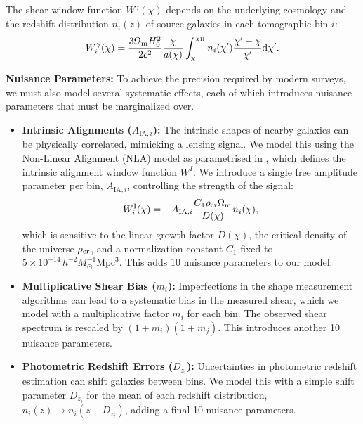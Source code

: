 \documentclass[twocolumn]{openjournal}
\begin{document}
The shear window function $W^\gamma(\chi)$ depends on the underlying cosmology and the redshift distribution $n_i(z)$ of source galaxies in each tomographic bin $i$:
\begin{equation}
	W_i^\gamma (\chi) = \frac{3 \Omega_{\rm m} H_0^2 }{2  c^2} \frac{\chi}{a(\chi)} \int_{\chi}^{\chi_{\rm H}}   n_{i}(\chi')  \frac{\chi'-\chi}{\chi'} \mathrm{d} \chi'.
\end{equation}

\textbf{Nuisance Parameters:} To achieve the precision required by modern surveys, we must also model several systematic effects, each of which introduces nuisance parameters that must be marginalized over.
\begin{itemize}
    \item \textbf{Intrinsic Alignments ($A_{\text{IA},i}$):} The intrinsic shapes of nearby galaxies can be physically correlated, mimicking a lensing signal. We model this using the Non-Linear Alignment (NLA) model \citep{hirata_04} as parametrised in \citep{Piras_2023}, which defines the intrinsic alignment window function $W^I$. We introduce a single free amplitude parameter per bin, $A_{\text{IA},i}$, controlling the strength of the signal:
    \begin{equation}
    	W_i^{\rm I}(\chi) = - A_{\mathrm{IA}, i}  \frac{C_1  \rho_{\rm cr}  \Omega_{\rm m}}{D(\chi)}  n_{i}(\chi),
    \end{equation}  
     which is sensitive to the linear growth factor $D(\chi)$, the critical density of the universe $\rho_{\rm cr}$, and a normalization constant $C_1$ fixed to $5 \times 10^{-14} \, h^{-2} M_\odot^{-1} \text{Mpc}^3$.     This adds 10 nuisance parameters to our model.
    \item \textbf{Multiplicative Shear Bias ($m_i$):} Imperfections in the shape measurement algorithms can lead to a systematic bias in the measured shear, which we model with a multiplicative factor $m_i$ for each bin. The observed shear spectrum is rescaled by $(1 + m_i)(1 + m_j)$. This introduces another 10 nuisance parameters.

    \item \textbf{Photometric Redshift Errors ($D_{z_i}$):} Uncertainties in photometric redshift estimation can shift galaxies between bins. We model this with a simple shift parameter $D_{z_i}$ for the mean of each redshift distribution, $n_i(z) \rightarrow n_i(z - D_{z_i})$, adding a final 10 nuisance parameters.
\end{itemize}
\end{document}

